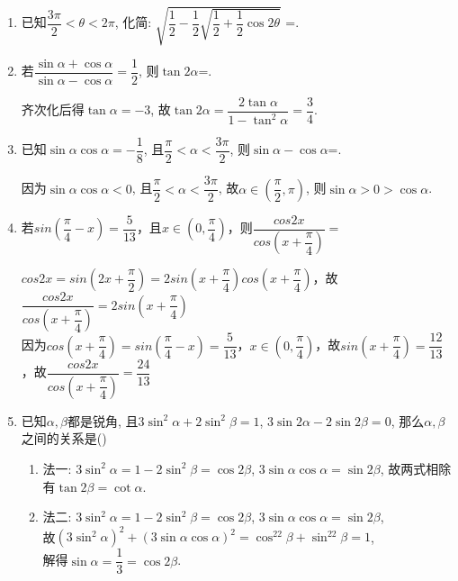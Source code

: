 \begin{enumerate}
    
    \item 已知$\dfrac{3\pi}{2}<\theta<2\pi$, 化简: $\sqrt{\dfrac{1}{2}-\dfrac{1}{2}\sqrt{\dfrac{1}{2}+\dfrac{1}{2}\cos2\theta}}$ =. 
    
    \item 若$\dfrac{\sin\alpha+\cos\alpha}{\sin\alpha-\cos\alpha}=\dfrac{1}{2}$, 则$\tan2\alpha$=. 
    \begin{jieda}
    齐次化后得$\tan\alpha=-3$, 故$\tan2\alpha=\dfrac{2\tan\alpha}{1-\tan^2\alpha}=\dfrac{3}{4}$. 
    \end{jieda}
    
    \item 已知$\sin\alpha\cos\alpha=-\dfrac{1}{8}$, 且$\dfrac{\pi}{2}<\alpha<\dfrac{3\pi}{2}$, 则$\sin\alpha-\cos\alpha$=. 
    \begin{jieda}
    因为$\sin\alpha\cos\alpha<0$, 且$\dfrac{\pi}{2}<\alpha<\dfrac{3\pi}{2}$, 故$\alpha\in\left(\dfrac{\pi}{2},\pi\right)$, 则$\sin\alpha>0>\cos\alpha$. 
    \end{jieda}
    \item 若$sin(\dfrac{\pi}{4} - x) = \dfrac{5}{13}$，且$x \in (0, \dfrac{\pi}{4})$，则$\dfrac{cos2x}{cos(x+\dfrac{\pi}{4})} = $
    \begin{jieda}
        $cos2x = sin(2x+\dfrac{\pi}{2}) = 2sin(x+\dfrac{\pi}{4})cos(x+\dfrac{\pi}{4})$，故$\dfrac{cos2x}{cos(x+\dfrac{\pi}{4})} = 2sin(x+\dfrac{\pi}{4})$ \\
        因为$cos(x+\dfrac{\pi}{4}) = sin(\dfrac{\pi}{4} - x) = \dfrac{5}{13}$，$x \in (0, \dfrac{\pi}{4})$，故$sin(x+\dfrac{\pi}{4}) = \dfrac{12}{13}$，故$\dfrac{cos2x}{cos(x+\dfrac{\pi}{4})} = \dfrac{24}{13}$
    \end{jieda}
    \item 已知$\alpha,\beta$都是锐角, 且$3\sin^2\alpha+2\sin^2\beta=1$, $3\sin2\alpha-2\sin2\beta=0$, 那么$\alpha,\beta$之间的关系是\dotfill()
    \begin{jieda}
    \begin{enumerate}
        \item 法一: $3\sin^2\alpha=1-2\sin^2\beta=\cos2\beta$, $3\sin\alpha\cos\alpha=\sin2\beta$, 故两式相除有$\tan2\beta=\cot\alpha$. 
        \item 法二: $3\sin^2\alpha=1-2\sin^2\beta=\cos2\beta$, $3\sin\alpha\cos\alpha=\sin2\beta$,\\
        故$\left(3\sin^2\alpha\right)^2+\left(3\sin\alpha\cos\alpha\right)^2=\cos^22\beta+\sin^22\beta=1$, \\
        解得$\sin\alpha=\dfrac{1}{3}=\cos2\beta$. 
    \end{enumerate}
    \end{jieda}
    

\end{enumerate}
